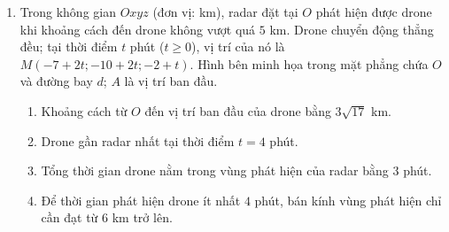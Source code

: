 \documentclass[12pt,a4paper]{article}
\begin{document}
\begin{enumerate}
\item \begin{minipage}[t]{0.55\linewidth}
Trong không gian $Oxyz$ (đơn vị: km), radar đặt tại $O$ phát hiện được drone khi khoảng cách đến drone không vượt quá $5$ km. Drone chuyển động thẳng đều; tại thời điểm $t$ phút ($t\geq0$), vị trí của nó là $M(-7+2t;-10+2t;-2+t)$. Hình bên minh họa trong mặt phẳng chứa $O$ và đường bay $d$; $A$ là vị trí ban đầu.
\begin{enumerate}[label=\alph*)]
\item Khoảng cách từ $O$ đến vị trí ban đầu của drone bằng $3\sqrt{17}$ km.
\item Drone gần radar nhất tại thời điểm $t=4$ phút.
\item Tổng thời gian drone nằm trong vùng phát hiện của radar bằng $3$ phút.
\item Để thời gian phát hiện drone ít nhất $4$ phút, bán kính vùng phát hiện chỉ cần đạt từ $6$ km trở lên.
\end{enumerate}
\end{minipage}\hfill
\begin{minipage}[t]{0.42\linewidth}
\vspace{-0.4\baselineskip}\centering
{}
\end{minipage}


\end{enumerate}
\end{document}
